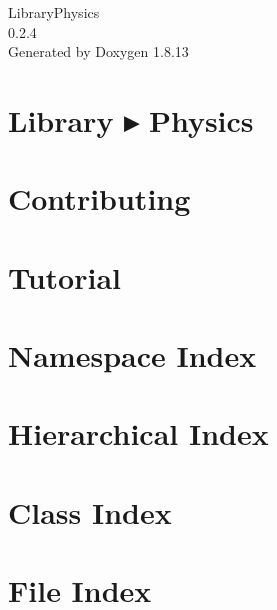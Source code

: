 \documentclass[twoside]{book}
\newcommand{\+}{\discretionary{\mbox{\scriptsize$\hookleftarrow$}}{}{}}
\newcommand{\clearemptydoublepage}{%
  \newpage{\pagestyle{empty}\cleardoublepage}%
}
\begin{document}
\hypersetup{pageanchor=false,
             bookmarksnumbered=true,
             pdfencoding=unicode
            }
\begin{titlepage}
\vspace*{7cm}
\begin{center}%
{\Large Library\+Physics \\[1ex]\large 0.\+2.\+4 }\\
\vspace*{1cm}
{\large Generated by Doxygen 1.8.13}\\
\end{center}
\end{titlepage}
\clearemptydoublepage
{}
\tableofcontents
\clearemptydoublepage
{}
\hypersetup{pageanchor=true}

\chapter{Library ▸ Physics}
\label{index}\hypertarget{index}{}
\chapter{Contributing}
\label{md__c_o_n_t_r_i_b_u_t_i_n_g}

\chapter{Tutorial}
\label{md_docs__tutorial}

\chapter{Namespace Index}

\chapter{Hierarchical Index}

\chapter{Class Index}

\chapter{File Index}

\end{document}
